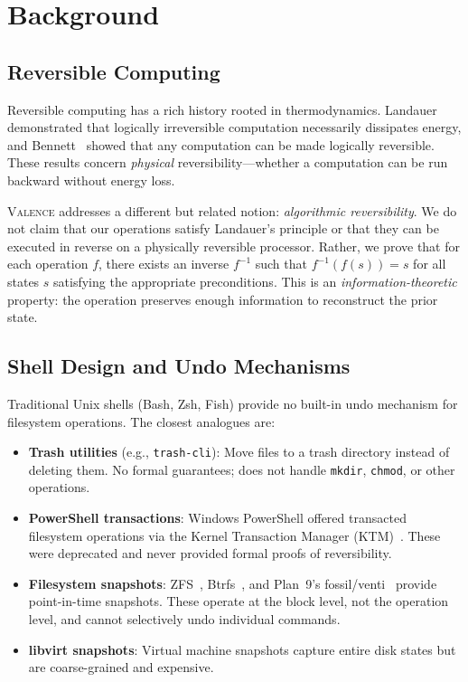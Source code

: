 \documentclass[11pt,a4paper]{article}
\newcommand{\inv}[1]{#1^{-1}}
\newcommand{\valence}{\textsc{Valence}}
\begin{document}
\section{Background}
\label{sec:background}

\subsection{Reversible Computing}

Reversible computing has a rich history rooted in thermodynamics.
Landauer~\citep{landauer1961} demonstrated that logically irreversible
computation necessarily dissipates energy, and Bennett~\citep{bennett1973}
showed that any computation can be made logically reversible. These results
concern \emph{physical} reversibility---whether a computation can be run
backward without energy loss.

\valence{} addresses a different but related notion: \emph{algorithmic
reversibility}. We do not claim that our operations satisfy Landauer's
principle or that they can be executed in reverse on a physically reversible
processor. Rather, we prove that for each operation $f$, there exists an
inverse $\inv{f}$ such that $\inv{f}(f(s)) = s$ for all states $s$ satisfying
the appropriate preconditions. This is an \emph{information-theoretic}
property: the operation preserves enough information to reconstruct the prior
state.

\subsection{Shell Design and Undo Mechanisms}

Traditional Unix shells (Bash, Zsh, Fish) provide no built-in undo mechanism
for filesystem operations. The closest analogues are:

\begin{itemize}
  \item \textbf{Trash utilities} (e.g., \texttt{trash-cli}): Move files to a
        trash directory instead of deleting them. No formal guarantees; does
        not handle \texttt{mkdir}, \texttt{chmod}, or other operations.

  \item \textbf{PowerShell transactions}: Windows PowerShell offered
        transacted filesystem operations via the Kernel Transaction Manager
        (KTM)~\citep{powershell-transactions}. These were deprecated and never
        provided formal proofs of reversibility.

  \item \textbf{Filesystem snapshots}: ZFS~\citep{zfs}, Btrfs~\citep{btrfs},
        and Plan~9's fossil/venti~\citep{plan9fossil} provide point-in-time
        snapshots. These operate at the block level, not the operation level,
        and cannot selectively undo individual commands.

  \item \textbf{libvirt snapshots}: Virtual machine snapshots capture entire
        disk states but are coarse-grained and expensive.
\end{itemize}
\end{document}
